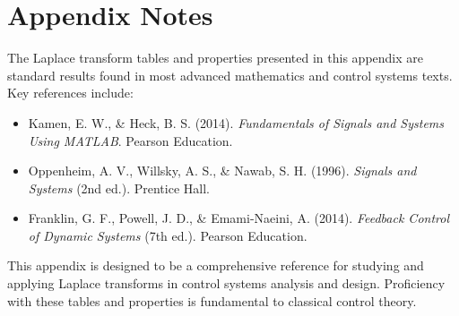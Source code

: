 
\section*{Appendix Notes}

The Laplace transform tables and properties presented in this appendix are standard results found in most advanced mathematics and control systems texts. Key references include:
\begin{itemize}
    \item Kamen, E. W., \& Heck, B. S. (2014). \textit{Fundamentals of Signals and Systems Using MATLAB}. Pearson Education.
    \item Oppenheim, A. V., Willsky, A. S., \& Nawab, S. H. (1996). \textit{Signals and Systems} (2nd ed.). Prentice Hall.
    \item Franklin, G. F., Powell, J. D., \& Emami-Naeini, A. (2014). \textit{Feedback Control of Dynamic Systems} (7th ed.). Pearson Education.
\end{itemize}

This appendix is designed to be a comprehensive reference for studying and applying Laplace transforms in control systems analysis and design. Proficiency with these tables and properties is fundamental to classical control theory.

